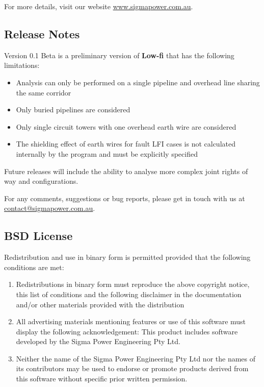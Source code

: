 \documentclass{article}
\begin{document}
For more details, visit our website \href{http://www.sigmapower.com.au}{www.sigmapower.com.au}.

\subsection{Release Notes}
Version 0.1 Beta is a preliminary version of \textbf{Low-fi} that has the following limitations:

\begin{itemize}
\item Analysis can only be performed on a single pipeline and overhead line sharing the same corridor
\item Only buried pipelines are considered
\item Only single circuit towers with one overhead earth wire are considered
\item The shielding effect of earth wires for fault LFI cases is not calculated internally by the program and must be explicitly specified
\end{itemize} 

Future releases will include the ability to analyse more complex joint rights of way and configurations.

For any comments, suggestions or bug reports, please get in touch with us at \href{mailto:contact@sigmapower.com.au}{contact@sigmapower.com.au}.

\subsection{BSD License}
Redistribution and use in  binary form is permitted provided that the following conditions are met:

\begin{enumerate}
\item Redistributions in binary form must reproduce the above copyright notice, this list of conditions and the following disclaimer in the documentation and/or other materials provided with the distribution
\item All advertising materials mentioning features or use of this software must display the following acknowledgement: This product includes software developed by the Sigma Power Engineering Pty Ltd.
\item Neither the name of the Sigma Power Engineering Pty Ltd nor the names of its contributors may be used to endorse or promote products derived from this software without specific prior written permission.
\end{enumerate}
\end{document}
